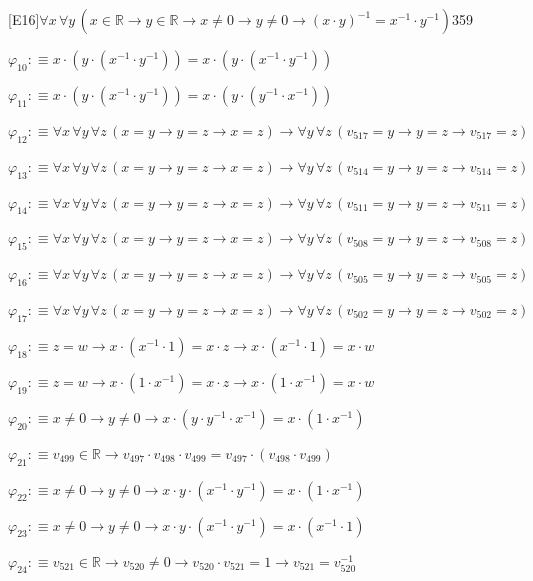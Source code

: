 \begin{fullproof}{[E16]}{$\forall x\,\forall y\,(x \in \mathbb{R} \to y \in \mathbb{R} \to x \neq 0 \to y \neq 0 \to (x \cdot y)^{-1} = x^{-1} \cdot y^{-1})$}{359}
\begin{abbrevlist}
\item $\varphi_{10} :\equiv x \cdot (y \cdot (x^{-1} \cdot y^{-1})) = x \cdot (y \cdot (x^{-1} \cdot y^{-1}))$
\item $\varphi_{11} :\equiv x \cdot (y \cdot (x^{-1} \cdot y^{-1})) = x \cdot (y \cdot (y^{-1} \cdot x^{-1}))$
\item $\varphi_{12} :\equiv \forall x\,\forall y\,\forall z\,(x = y \to y = z \to x = z) \to \forall y\,\forall z\,(v_{517} = y \to y = z \to v_{517} = z)$
\item $\varphi_{13} :\equiv \forall x\,\forall y\,\forall z\,(x = y \to y = z \to x = z) \to \forall y\,\forall z\,(v_{514} = y \to y = z \to v_{514} = z)$
\item $\varphi_{14} :\equiv \forall x\,\forall y\,\forall z\,(x = y \to y = z \to x = z) \to \forall y\,\forall z\,(v_{511} = y \to y = z \to v_{511} = z)$
\item $\varphi_{15} :\equiv \forall x\,\forall y\,\forall z\,(x = y \to y = z \to x = z) \to \forall y\,\forall z\,(v_{508} = y \to y = z \to v_{508} = z)$
\item $\varphi_{16} :\equiv \forall x\,\forall y\,\forall z\,(x = y \to y = z \to x = z) \to \forall y\,\forall z\,(v_{505} = y \to y = z \to v_{505} = z)$
\item $\varphi_{17} :\equiv \forall x\,\forall y\,\forall z\,(x = y \to y = z \to x = z) \to \forall y\,\forall z\,(v_{502} = y \to y = z \to v_{502} = z)$
\item $\varphi_{18} :\equiv z = w \to x \cdot (x^{-1} \cdot 1) = x \cdot z \to x \cdot (x^{-1} \cdot 1) = x \cdot w$
\item $\varphi_{19} :\equiv z = w \to x \cdot (1 \cdot x^{-1}) = x \cdot z \to x \cdot (1 \cdot x^{-1}) = x \cdot w$
\item $\varphi_{20} :\equiv x \neq 0 \to y \neq 0 \to x \cdot (y \cdot y^{-1} \cdot x^{-1}) = x \cdot (1 \cdot x^{-1})$
\item $\varphi_{21} :\equiv v_{499} \in \mathbb{R} \to v_{497} \cdot v_{498} \cdot v_{499} = v_{497} \cdot (v_{498} \cdot v_{499})$
\item $\varphi_{22} :\equiv x \neq 0 \to y \neq 0 \to x \cdot y \cdot (x^{-1} \cdot y^{-1}) = x \cdot (1 \cdot x^{-1})$
\item $\varphi_{23} :\equiv x \neq 0 \to y \neq 0 \to x \cdot y \cdot (x^{-1} \cdot y^{-1}) = x \cdot (x^{-1} \cdot 1)$
\item $\varphi_{24} :\equiv v_{521} \in \mathbb{R} \to v_{520} \neq 0 \to v_{520} \cdot v_{521} = 1 \to v_{521} = v_{520}^{-1}$

\end{abbrevlist}
\end{fullproof}
